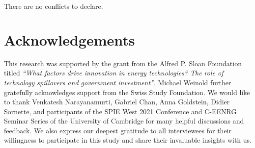 \documentclass[twoside,twocolumn,9pt]{article}
\renewcommand{\refname}{Notes and references}
\begin{document}
There are no conflicts to declare.

\section*{Acknowledgements}
This research was supported by the grant from the Alfred P. Sloan Foundation titled \textit{“What factors drive innovation in energy technologies? The role of technology spillovers and government investment”}. Michael Weinold further gratefully acknowledges support from the Swiss Study Foundation. We would like to thank Venkatesh Narayanamurti, Gabriel Chan, Anna Goldstein, Didier Sornette, and participants of the SPIE West 2021 Conference and C-EENRG Seminar Series of the University of Cambridge for many helpful discussions and feedback. We also express our deepest gratitude to all interviewees for their willingness to participate in this study and share their invaluable insights with us. 



\balance



\end{document}
